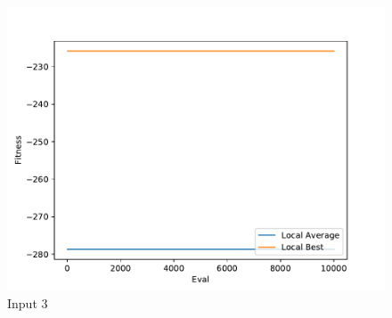 \documentclass{standalone}
\begin{document}
\begin{figure}[!htb]
	\caption{Input 3}
	\label{fig:graph_3015}
	\includegraphics[width=\textwidth]{../graphs/graphs/3015.pdf}
\end{figure}
\end{document}
